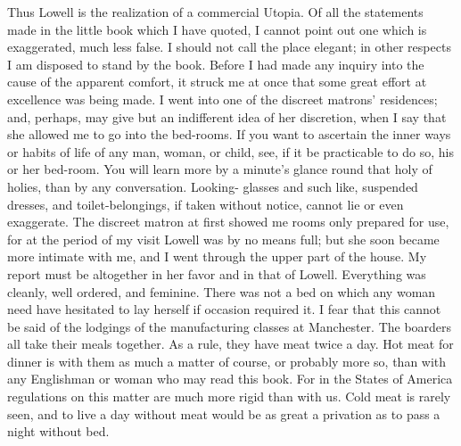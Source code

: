 Thus Lowell is the realization of a commercial Utopia.  Of all the
statements made in the little book which I have quoted, I cannot
point out one which is exaggerated, much less false.  I should not
call the place elegant; in other respects I am disposed to stand by
the book.  Before I had made any inquiry into the cause of the
apparent comfort, it struck me at once that some great effort at
excellence was being made.  I went into one of the discreet
matrons' residences; and, perhaps, may give but an indifferent idea
of her discretion, when I say that she allowed me to go into the
bed-rooms.  If you want to ascertain the inner ways or habits of
life of any man, woman, or child, see, if it be practicable to do
so, his or her bed-room.  You will learn more by a minute's glance
round that holy of holies, than by any conversation.  Looking-
glasses and such like, suspended dresses, and toilet-belongings, if
taken without notice, cannot lie or even exaggerate.  The discreet
matron at first showed me rooms only prepared for use, for at the
period of my visit Lowell was by no means full; but she soon became
more intimate with me, and I went through the upper part of the
house.  My report must be altogether in her favor and in that of
Lowell.  Everything was cleanly, well ordered, and feminine.  There
was not a bed on which any woman need have hesitated to lay herself
if occasion required it.  I fear that this cannot be said of the
lodgings of the manufacturing classes at Manchester.  The boarders
all take their meals together.  As a rule, they have meat twice a
day.  Hot meat for dinner is with them as much a matter of course,
or probably more so, than with any Englishman or woman who may read
this book.  For in the States of America regulations on this matter
are much more rigid than with us.  Cold meat is rarely seen, and to
live a day without meat would be as great a privation as to pass a
night without bed.

